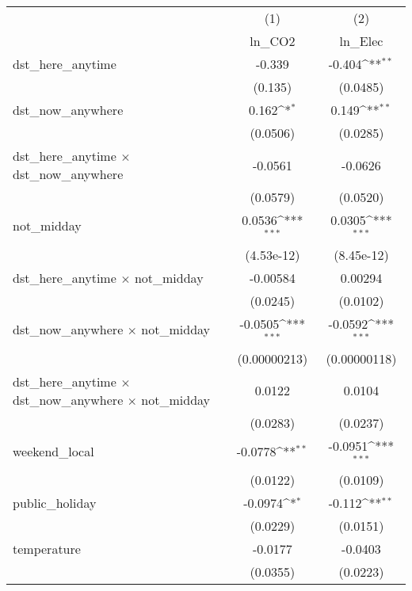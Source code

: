 {
\def\sym#1{\ifmmode^{#1}\else\(^{#1}\)\fi}
\begin{tabular}{l*{2}{c}}
\hline\hline
                    &\multicolumn{1}{c}{(1)}&\multicolumn{1}{c}{(2)}\\
                    &\multicolumn{1}{c}{ln\_CO2}&\multicolumn{1}{c}{ln\_Elec}\\
\hline
dst\_here\_anytime    &      -0.339         &      -0.404\sym{**} \\
                    &     (0.135)         &    (0.0485)         \\
[1em]
dst\_now\_anywhere    &       0.162\sym{*}  &       0.149\sym{**} \\
                    &    (0.0506)         &    (0.0285)         \\
[1em]
dst\_here\_anytime $\times$ dst\_now\_anywhere&     -0.0561         &     -0.0626         \\
                    &    (0.0579)         &    (0.0520)         \\
[1em]
not\_midday          &      0.0536\sym{***}&      0.0305\sym{***}\\
                    &  (4.53e-12)         &  (8.45e-12)         \\
[1em]
dst\_here\_anytime $\times$ not\_midday&    -0.00584         &     0.00294         \\
                    &    (0.0245)         &    (0.0102)         \\
[1em]
dst\_now\_anywhere $\times$ not\_midday&     -0.0505\sym{***}&     -0.0592\sym{***}\\
                    &(0.00000213)         &(0.00000118)         \\
[1em]
dst\_here\_anytime $\times$ dst\_now\_anywhere $\times$ not\_midday&      0.0122         &      0.0104         \\
                    &    (0.0283)         &    (0.0237)         \\
[1em]
weekend\_local       &     -0.0778\sym{**} &     -0.0951\sym{***}\\
                    &    (0.0122)         &    (0.0109)         \\
[1em]
public\_holiday      &     -0.0974\sym{*}  &      -0.112\sym{**} \\
                    &    (0.0229)         &    (0.0151)         \\
[1em]
temperature         &     -0.0177         &     -0.0403         \\
                    &    (0.0355)         &    (0.0223)         \\

\end{tabular}}

